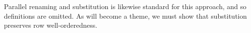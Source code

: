 \documentclass[authoryear, acmsmall, screen, review, nonacm]{acmart}
\begin{document}
\Ni Parallel renaming and substitution is likewise standard for this approach, and so definitions are omitted. As will become a theme, we must show that substitution preserves row well-orderedness.

\begin{code}%
\>[0]\AgdaSpace{}%
\AgdaSymbol{:}%
\>[10]\AgdaSpace{}%
\AgdaSpace{}%
\AgdaSpace{}%
\AgdaSpace{}%
\AgdaSymbol{(}\AgdaSpace{}%
\AgdaOperator{\AgdaInductiveConstructor{,,}}\AgdaSpace{}%
\AgdaSymbol{)}\AgdaSpace{}%
\AgdaSymbol{(}\AgdaSpace{}%
\AgdaOperator{\AgdaInductiveConstructor{,,}}\AgdaSpace{}%
\AgdaSymbol{)}\<%
\\
\>[0]\AgdaSpace{}%
\AgdaSymbol{:}\AgdaSpace{}%
\AgdaSpace{}%
\AgdaSpace{}%
\AgdaSpace{}%
\AgdaSpace{}%
\AgdaSpace{}%
\AgdaSpace{}%
\AgdaSpace{}%
\AgdaSpace{}%
\AgdaSpace{}%
\AgdaSpace{}%
\<%
\\
\>[0]\AgdaSpace{}%
\AgdaSymbol{:}\AgdaSpace{}%
\AgdaSpace{}%
\AgdaSpace{}%
\AgdaSpace{}%
\AgdaSpace{}%
\AgdaSpace{}%
\AgdaSpace{}%
\AgdaSpace{}%
\AgdaSpace{}%
\AgdaSpace{}%
\AgdaSpace{}%
\AgdaSpace{}%
\AgdaSpace{}%
\<%
\\
\>[0]\AgdaSpace{}%
\AgdaSymbol{:}\AgdaSpace{}%
\AgdaSpace{}%
\AgdaSpace{}%
\AgdaSpace{}%
\AgdaSpace{}%
\AgdaSpace{}%
\AgdaSpace{}%
\AgdaSpace{}%
\AgdaOperator{\AgdaInductiveConstructor{R[}}\AgdaSpace{}%
\AgdaSpace{}%
\AgdaOperator{\AgdaInductiveConstructor{]}}\AgdaSpace{}%
\AgdaSpace{}%
\AgdaSpace{}%
\AgdaSpace{}%
\AgdaSpace{}%
\AgdaOperator{\AgdaInductiveConstructor{R[}}\AgdaSpace{}%
\AgdaSpace{}%
\AgdaOperator{\AgdaInductiveConstructor{]}}\<%

\end{code}
\end{document}
